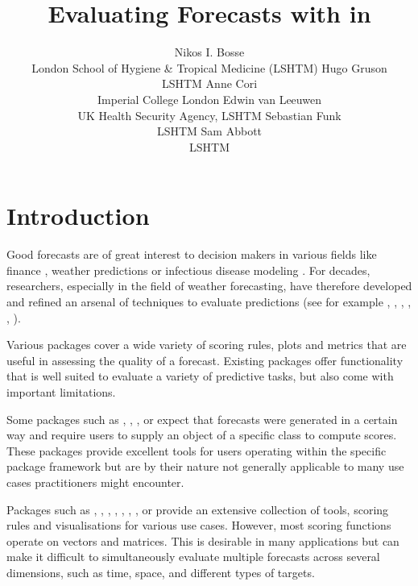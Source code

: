 \documentclass[
]{jss}
\author{
Nikos I. Bosse\\London School of Hygiene \& Tropical Medicine (LSHTM)
\AND Hugo Gruson\\LSHTM \And Anne Cori\\Imperial College London
\AND Edwin van Leeuwen\\UK Health Security Agency,
LSHTM \And Sebastian Funk\\LSHTM \And Sam Abbott\\LSHTM
}
\title{Evaluating Forecasts with \pkg{scoringutils} in \proglang{R}}
\begin{document}
\section{Introduction}\label{introduction}

Good forecasts are of great interest to decision makers in various
fields like finance
\citep{timmermannForecastingMethodsFinance2018, elliottForecastingEconomicsFinance2016},
weather predictions
\citep{gneitingWeatherForecastingEnsemble2005, kukkonenReviewOperationalRegionalscale2012}
or infectious disease modeling
\citep{reichCollaborativeMultiyearMultimodel2019, funkShorttermForecastsInform2020, cramerEvaluationIndividualEnsemble2021, bracherNationalSubnationalShortterm2022, sherrattPredictivePerformanceMultimodel2022}.
For decades, researchers, especially in the field of weather
forecasting, have therefore developed and refined an arsenal of
techniques to evaluate predictions (see for example
\cite{goodRationalDecisions1952},
\cite{epsteinScoringSystemProbability1969, murphyNoteRankedProbability1971a, mathesonScoringRulesContinuous1976},
\cite{gneitingProbabilisticForecastsCalibration2007},
\cite{funkAssessingPerformanceRealtime2019},
\cite{gneitingStrictlyProperScoring2007},
\cite{bracherEvaluatingEpidemicForecasts2021}).

Various  \citep{R} packages cover a wide variety of scoring
rules, plots and metrics that are useful in assessing the quality of a
forecast. Existing packages offer functionality that is well suited to
evaluate a variety of predictive tasks, but also come with important
limitations.

Some packages such as  \citep{tscount}, 
\citep{topmodels},  \citep{GLMMadaptive}, 
\citep{cvGEE} or  \citep{fabletools} expect that
forecasts were generated in a certain way and require users to supply an
object of a specific class to compute scores. These packages provide
excellent tools for users operating within the specific package
framework but are by their nature not generally applicable to many use
cases practitioners might encounter.

Packages such as  \citep{scoringRules}, 
\citep{Metrics},  \citep{MLmetrics}, 
\citep{verification},  \citep{SpecsVerification},
 \citep{surveillance}, 
\citep{predtools}, or  \citep{probably} provide an
extensive collection of tools, scoring rules and visualisations for
various use cases. However, most scoring functions operate on vectors
and matrices. This is desirable in many applications but can make it
difficult to simultaneously evaluate multiple forecasts across several
dimensions, such as time, space, and different types of targets.
\end{document}
